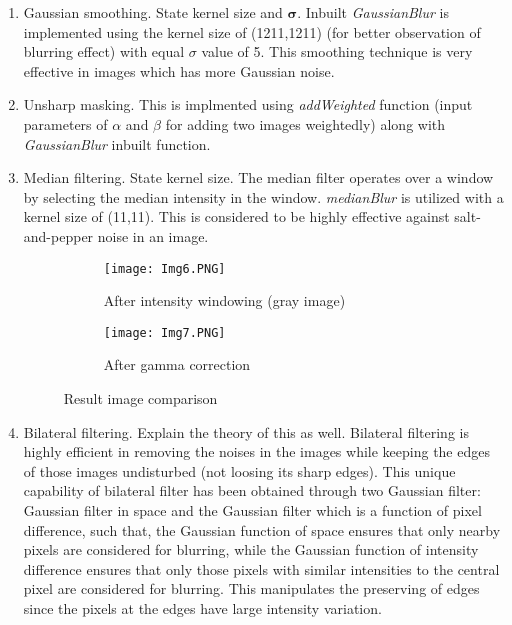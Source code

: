\documentclass[11pt]{scrartcl}
\begin{document}
{\begin{enumerate}[label=(\alph*)]
\item Gaussian smoothing. State kernel size and ${\mathbf{\sigma}}$. \newline
Inbuilt \textit{GaussianBlur} is implemented using the kernel size of (1211,1211) (for better observation of blurring effect) with equal $\sigma$ value of 5. This smoothing technique is very effective in images which has more Gaussian noise.
\item Unsharp masking. \newline
This is implmented using \textit{addWeighted} function (input parameters of $\alpha$ and $\beta$ for adding two images weightedly) along with \textit{GaussianBlur} inbuilt function.
\item Median filtering. State kernel size.\newline
The median filter operates over a window by selecting the median intensity in the window. \textit{medianBlur} is utilized with a kernel size of (11,11). This is considered to be highly effective against salt-and-pepper noise in an image.
\begin{figure}
\centering
\begin{subfigure}{.5\textwidth}
  \centering
  \texttt{[image: Img6.PNG]}
  \caption{After intensity windowing (gray image)}
  \label{fig:sub1}
\end{subfigure}%
\begin{subfigure}{0.5\textwidth}
  \centering
  \texttt{[image: Img7.PNG]}
  \caption{After gamma correction}
  \label{fig:sub2}
\end{subfigure}
\caption{Result image comparison}
\label{fig:test}
\end{figure}
\item Bilateral filtering. Explain the theory of this as well.\newline
Bilateral filtering is highly efficient in removing the noises in the images while keeping the edges of those images undisturbed (not loosing its sharp edges). This unique capability of bilateral filter has been obtained through two Gaussian filter: Gaussian filter in space and the Gaussian filter which is a function of pixel difference, such that, the Gaussian function of space ensures that only nearby pixels are considered for blurring, while the Gaussian function of intensity difference ensures that only those pixels with similar intensities to the central pixel are considered for blurring. This manipulates the preserving of edges since the pixels at the edges have large intensity variation.


\end{enumerate}}
\end{document}
